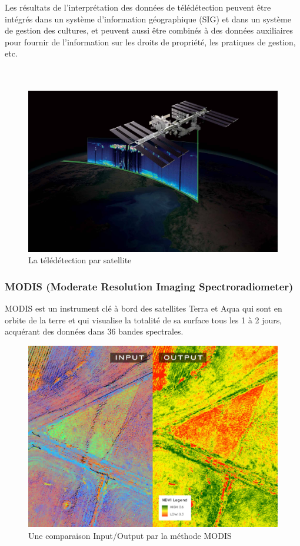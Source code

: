 \documentclass[12pt, openany]{report}
\begin{document}
\par
Les résultats de l'interprétation des données de télédétection peuvent être intégrés dans un système d'information géographique (SIG) et dans un système de gestion des cultures, et peuvent aussi être combinés à des données auxiliaires pour fournir de l'information sur les droits de propriété, les pratiques de gestion, etc. \cite{cropmapp}\\ \\ \\

\begin{figure}[h]
\centering
\includegraphics[scale=0.2]{tele.jpg}
\caption{La télédétection par satellite}
\end{figure}

\subsubsection{MODIS (Moderate Resolution Imaging Spectroradiometer)}
MODIS est un instrument clé à bord des satellites Terra et Aqua qui sont en orbite de la terre et qui visualise la totalité de sa surface tous les 1 à 2 jours, acquérant des données dans 36 bandes spectrales.

\begin{figure}[h]
\centering
\includegraphics[scale=0.35]{modis.png}
\caption{Une comparaison Input/Output par la méthode MODIS}
\end{figure}
\end{document}
